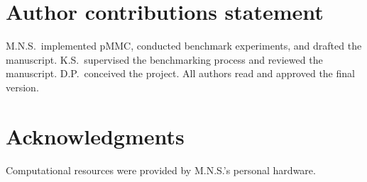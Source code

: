 \documentclass[webpdf,traditional,large]{oup-authoring-template}%
\begin{document}
\section*{Author contributions statement}
M.N.S.\ implemented pMMC, conducted benchmark
experiments, and drafted the manuscript. K.S.\ supervised the
benchmarking process and reviewed the manuscript. D.P.\ conceived
the project. All authors read and approved the final version.

\section*{Acknowledgments}
Computational resources were provided by M.N.S.'s personal
hardware.



\end{document}

